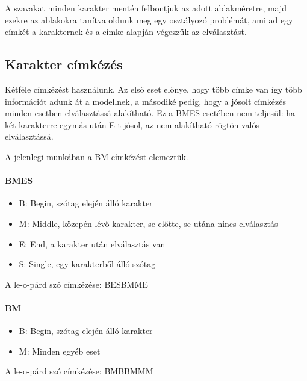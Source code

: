 \documentclass[a4paper, magyar]{article}
\begin{document}
A szavakat minden karakter mentén felbontjuk az adott ablakméretre, majd ezekre az ablakokra tanítva oldunk meg egy osztályozó problémát, ami ad egy címkét a karakternek és a címke alapján végezzük az elválasztást.
\subsection{Karakter címkézés}
Kétféle címkézést használunk. Az első eset előnye, hogy több címke van így több információt adunk át a modellnek, a másodiké pedig, hogy a jósolt címkézés minden esetben elválasztássá alakítható. Ez a BMES esetében nem teljesül: ha két karakterre egymás után E-t jósol, az nem alakítható rögtön valós elválasztássá.

A jelenlegi munkában a BM címkézést elemeztük.
\paragraph{BMES}
\begin{itemize}
	\item B: Begin, szótag elején álló karakter
	\item M: Middle, közepén lévő karakter, se előtte, se utána nincs elválasztás
	\item E: End, a karakter után elválasztás van
	\item S: Single, egy karakterből álló szótag
\end{itemize}
A
{\selectfont
	le-o-párd%
}
szó címkézése:
{\selectfont
	BESBMME%
}
\paragraph{BM}
\begin{itemize}
	\item B: Begin, szótag elején álló karakter
	\item M: Minden egyéb eset
\end{itemize}
A
{\selectfont
	le-o-párd%
}
szó címkézése:
{\selectfont
	BMBBMMM%
}
\end{document}
